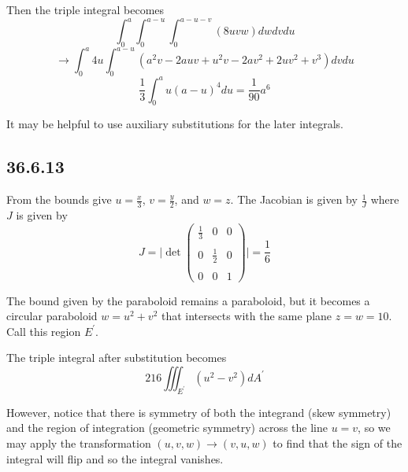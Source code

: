 \documentclass{article}
\begin{document}
 Then the triple integral becomes
 $$\int_{0}^{a}\int_{0}^{a-u}\int_{0}^{a-u-v} (8uvw) dwdvdu$$
 $$ \to \int_{0}^{a} 4u \int_{0}^{a-u}(a^2 v - 2 a u v + u^2 v - 2 a v^2 + 2 u v^2 + v^3)dvdu$$
 $$\frac{1}{3}\int_0^a u(a - u)^4 du = \frac{1}{90}a^6$$

 It may be helpful to use auxiliary substitutions for the later integrals.

\subsection{36.6.13}

From the bounds give $u=\frac{x}{3}$, $v=\frac{y}{2}$, and $w=z$. The Jacobian is given by $\frac{1}{J}$ where $J$ is given by $$J = \bigg| \det \begin{pmatrix}
    \frac{1}{3} & 0 & 0 \\
    \\
    0 & \frac{1}{2} & 0 \\
    \\
    0 &0 & 1
\end{pmatrix}\bigg| = \frac{1}{6}$$

The bound given by the paraboloid remains a paraboloid, but it becomes a circular paraboloid $w = u^2+v^2$ that intersects with the same plane $z=w=10$. Call this region $E^{\prime}$.

The triple integral after substitution becomes $$216\iiint_{E^{\prime}} (u^2-v^2)dA^{\prime}$$

However, notice that there is symmetry of both the integrand (skew symmetry) and the region of integration (geometric symmetry) across the line $u=v$, so we may apply the transformation $(u,v,w)\to (v,u,w)$ to find that the sign of the integral will flip and so the integral vanishes.
\end{document}
